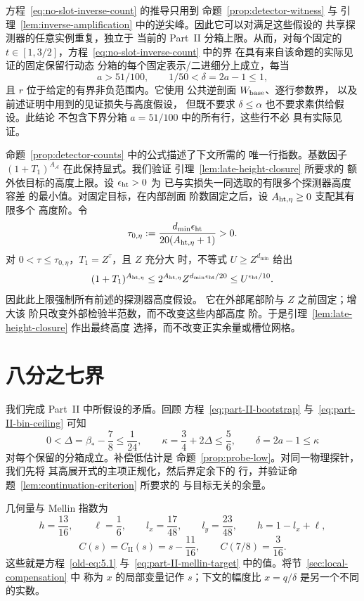 \begin{remark}
方程~\eqref{eq:no-slot-inverse-count} 的推导只用到
命题~\ref{prop:detector-witness} 与
引理~\ref{lem:inverse-amplification} 中的逆尖峰。因此它可以对满足这些假设的
共享探测器的任意实例重复，独立于
当前的 Part~II 分箱上限。从而，对每个固定的
\(t\in[1,3/2]\)，方程~\eqref{eq:no-slot-inverse-count} 中的界
在具有来自该命题的实际见证的固定保留行动态
分箱的每个固定表示/二进细分上成立，每当
\[
 a>51/100,\qquad 1/50<\delta=2a-1\le1,
\]
且 \(r\) 位于给定的有界非负范围内。它使用
公共逆剖面 \(W_{\rm base}\)、逐行参数界，
以及前述证明中用到的见证损失与高度假设，
但既不要求
\(\delta\le\alpha\) 也不要求素供给假设。此结论
不包含下界分箱 \(a=51/100\) 中的所有行，这些行不必
具有实际见证。
\end{remark}

命题~\ref{prop:detector-counts} 中的公式描述了下文所需的
唯一行指数。基数因子
\((1+T_1)^{A_{\mathcal A}}\) 在此保持显式。我们验证
引理~\ref{lem:late-height-closure} 所要求的
额外依目标的高度上限。设 \(\epsilon_{\rm ht}>0\) 为
已与实损失一同选取的有限多个探测器高度容差
的最小值。对固定目标，在内部剖面
阶数固定之后，设 \(A_{{\rm ht},\eta}\ge0\) 支配其有限多个
高度阶。令
\[
 \tau_{0,\eta}:=
 \frac{d_{\min}\epsilon_{\rm ht}}{20(A_{{\rm ht},\eta}+1)}>0.
\]
对 \(0<\tau\le\tau_{0,\eta}\)，\(T_1=Z^\tau\)，且 \(Z\) 充分大
时，不等式 \(U\ge Z^{d_{\min}}\) 给出
\[
 (1+T_1)^{A_{{\rm ht},\eta}}
 \le 2^{A_{{\rm ht},\eta}}Z^{d_{\min}\epsilon_{\rm ht}/20}
 \le U^{\epsilon_{\rm ht}/10}.
\]
因此此上限强制所有前述的探测器高度假设。
它在外部尾部阶与 \(Z\) 之前固定；增大该
阶只改变外部检验半范数，而不改变这些内部高度
阶。于是引理~\ref{lem:late-height-closure} 作出最终高度
选择，而不改变正实余量或槽位网格。

\section{八分之七界}\label{sec:conclusion}

我们完成 Part~II 中所假设的矛盾。回顾
方程~\eqref{eq:part-II-bootstrap} 与~\eqref{eq:part-II-bin-ceiling}
可知
\[
 0<\Delta=\beta_*-\frac78\le\frac1{24},\qquad
 \kappa=\frac34+2\Delta\le\frac56,\qquad
 \delta=2a-1\le\kappa
\]
对每个保留的分箱成立。补偿低估计是
命题~\ref{prop:probe-low}。对同一物理探针，我们先将
其高展开式的主项正规化，然后界定余下的
行，并验证命题~\ref{lem:continuation-criterion} 所要求的
与目标无关的余量。

几何量与 Mellin 指数为
\[
 h=\frac{13}{16},\qquad \ell=\frac16,\qquad
 l_x=\frac{17}{48},\qquad l_y=\frac{23}{48},\qquad
 h=1-l_x+\ell,
\]
\[
 C(s)=C_{\mathrm{II}}(s)=s-\frac{11}{16},
 \qquad C(7/8)=\frac3{16}.
\]
这些就是方程~\eqref{old-eq:5.1}
与~\eqref{eq:part-II-mellin-target} 中的值。将节~\ref{sec:local-compensation} 中
称为 \(x\) 的局部变量记作 \(s\)；下文的幅度比
\(x=q/\delta\) 是另一个不同的实数。

